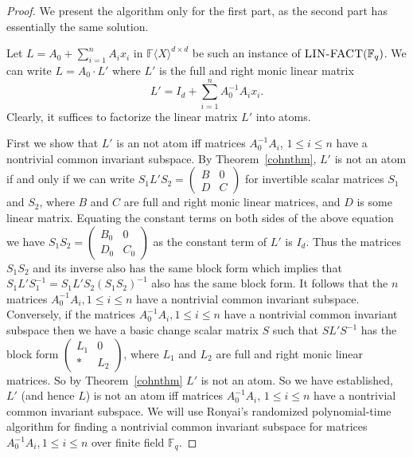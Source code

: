 \documentclass[10pt,a4paper]{article}
\newcommand{\F}{\mathbb{F}}
\renewcommand{\angle}[1]{\langle #1 \rangle}
\newcommand{\FX}{\F\angle{X}}
\newcommand{\fR}{\FX}
\newcommand{\prob}[1]{\textsc{#1}}
\begin{document}
\begin{proof}
  We present the algorithm only for the first part, as the second part
  has essentially the same solution.
  
  Let $L=A_0+\sum_{i=1}^n A_i x_i$ in $\fR^{d\times d}$ be such an
  instance of $\prob{LIN{-}FACT}(\F_q)$. We can write $L=A_0\cdot
  L'$ where $L'$ is the full and right monic linear matrix
  \[
  L'= I_d + \sum_{i=1}^n A_0^{-1}A_i x_i.
  \]
 Clearly, it suffices to factorize the linear matrix $L'$ into
 atoms. 
 
First we show that $L'$ is an not atom iff matrices $A_0^{-1}A_i$, $1\leq i \leq n$ have a nontrivial common invariant subspace.  
 By Theorem~\ref{cohnthm}, $L'$ is not an atom if and only if
 we can write $S_1L'S_2 = \left(
\begin{array}{cc}
B & 0 \\
D & C
\end{array}
\right)$ for invertible scalar matrices $S_1$ and $S_2$, where $B$ and
$C$ are full and right monic linear matrices, and $D$ is some linear
matrix. Equating the constant terms on both sides of 
the above equation we have $S_1S_2= \left(
\begin{array}{cc}
  B_0 & 0 \\
  D_0 & C_0
\end{array}
\right)$ as the constant term of $L'$ is $I_d$.  Thus the matrices $S_1S_2$ and its inverse also has the
same block form which implies that
$S_1L'S_1^{-1}=S_1L'S_2(S_1S_2)^{-1}$ also has the same block form. It follows that the $n$ matrices $A_0^{-1}A_i, 1\le i\le n$ have
a nontrivial common invariant subspace. Conversely, if the matrices
$A_0^{-1}A_i, 1\le i\le n$ have a nontrivial common invariant subspace
then we have a basic change scalar matrix $S$ such that $SL'S^{-1}$ has
the block form $\left(
\begin{array}{cc}
  L_1 & 0 \\
  * & L_2
\end{array}
\right)$,
where $L_1$ and $L_2$ are full and right monic linear matrices. So by Theorem~\ref{cohnthm} $L'$ is not an atom. 
 So we have established, $L'$  (and hence $L$) is not an atom iff matrices $A_0^{-1}A_i$, $1\leq i \leq n$ have a nontrivial common invariant subspace.
We will use Ronyai's randomized polynomial-time algorithm for finding
a nontrivial common invariant subspace for matrices $A_0^{-1}A_i, 1\le
i\le n$ over finite field $\F_q$. 


\end{proof}
\end{document}
